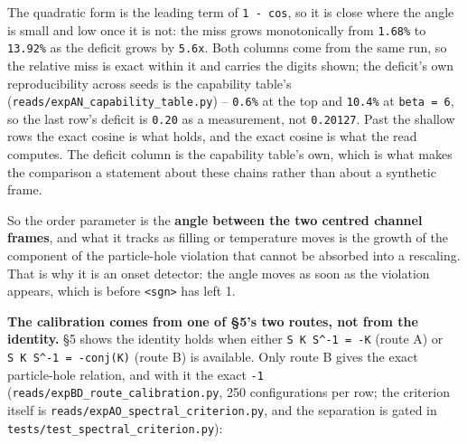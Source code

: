 \documentclass[10pt,letterpaper,twocolumn]{article}
\begin{document}
The quadratic form is the leading term of \texttt{1\ -{}\allowbreak{}\ cos}, so it is close where the angle is small and
low once it is not: the miss grows monotonically from \texttt{1.\allowbreak{}68\%} to \texttt{13.\allowbreak{}92\%} as the deficit grows by
\texttt{5.\allowbreak{}6x}. Both columns come from the same run, so the relative miss is exact within it
and carries the digits shown; the deficit's own reproducibility across seeds is the capability
table's (\texttt{reads/\allowbreak{}expAN\_\allowbreak{}capability\_\allowbreak{}table.\allowbreak{}py}) -- \texttt{0.\allowbreak{}6\%} at the top and \texttt{10.\allowbreak{}4\%} at \texttt{beta\ =\allowbreak{}\ 6}, so
the last row's deficit is \texttt{0.\allowbreak{}20} as a measurement, not \texttt{0.\allowbreak{}20127}. Past the shallow rows the
exact cosine is what holds, and the exact cosine is what the read computes. The deficit column is the capability table's own, which is
what makes the comparison a statement about these chains rather than about a synthetic frame.

So the order parameter is the \textbf{angle between the two centred channel frames}, and what it tracks
as filling or temperature moves is the growth of the component of the particle-hole violation that
cannot be absorbed into a rescaling. That is why it is an onset detector: the angle moves as soon
as the violation appears, which is before \texttt{\textless{}\allowbreak{}sgn\textgreater{}\allowbreak{}} has left 1.

\textbf{The calibration comes from one of §5's two routes, not from the identity.} §5 shows the identity
holds when either \texttt{S\ K\ S\^{}-{}\allowbreak{}1\ =\allowbreak{}\ -{}\allowbreak{}K} (route A) or \texttt{S\ K\ S\^{}-{}\allowbreak{}1\ =\allowbreak{}\ -{}\allowbreak{}conj(\allowbreak{}K)\allowbreak{}} (route B) is available. Only
route B gives the exact particle-hole relation, and with it the exact \texttt{-{}\allowbreak{}1}
(\texttt{reads/\allowbreak{}expBD\_\allowbreak{}route\_\allowbreak{}calibration.\allowbreak{}py}, 250 configurations per row; the criterion itself is
\texttt{reads/\allowbreak{}expAO\_\allowbreak{}spectral\_\allowbreak{}criterion.\allowbreak{}py}, and the separation is gated in
\texttt{tests/\allowbreak{}test\_\allowbreak{}spectral\_\allowbreak{}criterion.\allowbreak{}py}):
\end{document}

